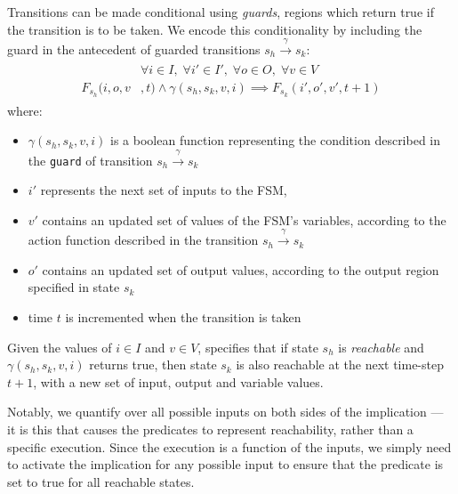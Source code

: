 \documentclass[acmsmall,screen,review]{acmart}
\begin{document}
Transitions can be made conditional using \textit{guards}, regions which return true if the transition is to be taken.
We encode this conditionality by including the guard in the antecedent of guarded transitions $s_h \xrightarrow{\gamma} s_k$:
\begin{align}
  \begin{split}
    &\forall i\in I,\;\forall i'\in I',\;\forall o\in O,\;\forall v\in V \\
    F_{s_h}(i, o, v&, t) \land \gamma(s_h, s_k, v, i) \implies F_{s_k}(i', o', v', t + 1) 
  \end{split}
  \label{eq:transition}
\end{align}
where: 
\begin{itemize}
\item $\gamma(s_h, s_k, v, i)$ is a boolean function representing the condition described in the \texttt{guard} of transition $s_h \xrightarrow{\gamma} s_k$
\item $i'$ represents the next set of inputs to the FSM, 
\item $v'$ contains an updated set of values of the FSM's variables, according to the action function described in the transition $s_h \xrightarrow{\gamma} s_k$  
\item $o'$ contains an updated set of output values, according to the output region specified in state $s_k$ 
\item time $t$ is incremented when the transition is taken
\end{itemize}

Given the values of $i\in I$ and $v\in V$,  specifies that if state $s_h$ is \textit{reachable} and $\gamma(s_h, s_k, v, i)$ returns true, 
then state $s_k$ is also reachable at the next time-step $t+1$, with a new set of input, output and variable values.

Notably, we quantify over all possible inputs on both sides of the implication --- it is this that causes the predicates to represent reachability, rather than a specific execution.
Since the execution is a function of the inputs, we simply need to activate the implication for any possible input to ensure that the predicate is set to true for all reachable states.
\end{document}
